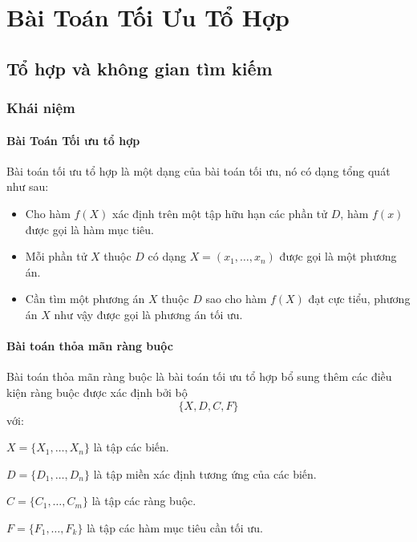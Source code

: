 \chapter{Bài Toán Tối Ưu Tổ Hợp}
\label{chap:combOpt}
\section{Tổ hợp và không gian tìm kiếm}
\label{sec:co_space}

\subsection{Khái niệm}

\subsubsection*{Bài Toán Tối ưu tổ hợp}
Bài toán tối ưu tổ hợp \cite{pascal2005cp} là một dạng của bài toán tối ưu, nó có dạng tổng quát như sau:
\begin{itemize}
	\item Cho hàm $f(X)$ xác định trên một tập hữu hạn các phần tử $D$, hàm $f(x)$ được gọi là hàm mục tiêu.
	\item Mỗi phần tử $X$ thuộc $D$ có dạng $X=(x_1,\dots,x_n)$ được gọi là một phương án.
	\item Cần tìm một phương án $X$ thuộc $D$ sao cho hàm $f(X)$ đạt cực tiểu, phương án $X$ như vậy được gọi là phương án tối ưu.
\end{itemize}

\subsubsection*{Bài toán thỏa mãn ràng buộc}

Bài toán thỏa mãn ràng buộc \cite{pascal2005cp} là bài toán tối ưu tổ hợp bổ sung thêm các điều kiện ràng buộc được xác định bởi bộ
\[
\{X, D, C, F\}
\]
với:
\begin{description}
	\item $X = \{X_1,\dotsc, X_n\}$ \quad là tập các biến.
	\item $D = \{D_1,\dotsc, D_n\}$ \quad là tập miền xác định tương ứng của các biến.
	\item $C = \{C_1,\dotsc, C_m\}$ \quad là tập các ràng buộc.
	\item $F = \{F_1,\dotsc, F_k\}$ \quad là tập các hàm mục tiêu cần tối ưu.
\end{description}

